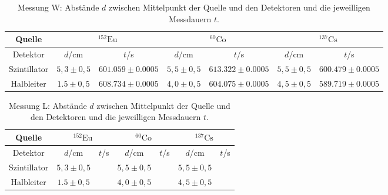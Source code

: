 \documentclass[ngerman,11pt]{article}
\begin{document}
\begin{multicols}{2}
	
	





























	\end{multicols}
\newpage
\begin{table}
	\centering
	\begin{tabular}{|c|c|c|c|c|c|c|}
		\hline
		Quelle & \multicolumn{2}{|c|}{$^{152}\mathrm{Eu}$}&\multicolumn{2}{|c|}{$^{60}\mathrm{Co}$}&\multicolumn{2}{|c|}{$^{137}\mathrm{Cs}$}\\ \hline
		Detektor& $d$/cm & $t$/s& $d$/cm & $t$/s& $d$/cm & $t$/s\\ \hline
		Szintillator & $5,3\pm0,5$ & $601.059 \pm0.0005$ & $5,5\pm 0,5$ & $613.322\pm0.0005$ & $5,5\pm0,5$ & $600.479 \pm0.0005$\\ \hline
		Halbleiter & $1.5\pm0,5$ & $608.734\pm 0.0005$ & $4,0\pm 0,5$ & $604.075\pm 0.0005$ & $4,5\pm0,5$ &$589.719 \pm 0.0005$ \\ \hline
	\end{tabular}
	\caption{Messung W: Abst\"ande $d$ zwischen Mittelpunkt der Quelle und den Detektoren und die  jeweilligen Messdauern $t$.}
\end{table}
\begin{table}
	\centering
	\begin{tabular}{|c|c|c|c|c|c|c|}
		\hline
		Quelle & \multicolumn{2}{|c|}{$^{152}\mathrm{Eu}$}&\multicolumn{2}{|c|}{$^{60}\mathrm{Co}$}&\multicolumn{2}{|c|}{$^{137}\mathrm{Cs}$}\\ \hline
		Detektor& $d$/cm & $t$/s& $d$/cm & $t$/s& $d$/cm & $t$/s\\ \hline
		Szintillator & $5,3\pm0,5$ & & $5,5\pm 0,5$ & & $5,5\pm0,5$ & \\ \hline
		Halbleiter & $1.5\pm0,5$ & & $4,0\pm 0,5$ & & $4,5\pm0,5$ & \\ \hline
	\end{tabular}
	\caption{Messung L: Abst\"ande $d$ zwischen Mittelpunkt der Quelle und den Detektoren und die jeweilligen Messdauern $t$.}
\end{table}
\end{document}
